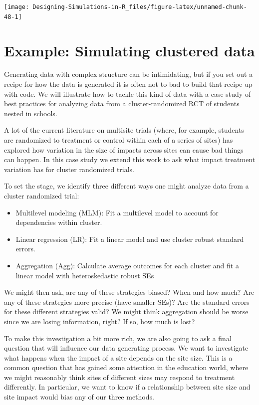\documentclass[
]{book}
\providecommand{\tightlist}{%
  \setlength{\itemsep}{0pt}\setlength{\parskip}{0pt}}
\begin{document}
\begin{center}\texttt{[image: Designing-Simulations-in-R\_files/figure-latex/unnamed-chunk-48-1]} \end{center}

\hypertarget{case_cluster}{%
\section{Example: Simulating clustered data}\label{case_cluster}}

Generating data with complex structure can be intimidating, but if you set out a recipe for how the data is generated it is often not to bad to build that recipe up with code.
We will illustrate how to tackle this kind of data with a case study of best practices for analyzing data from a cluster-randomized RCT of students nested in schools.

A lot of the current literature on multisite trials (where, for example, students are randomized to treatment or control within each of a series of sites) has explored how variation in the size of impacts across sites can cause bad things can happen.
In this case study we extend this work to ask what impact treatment variation has for cluster randomized trials.

To set the stage, we identify three different ways one might analyze data from a cluster randomized trial:

\begin{itemize}
\tightlist
\item
  Multilevel modeling (MLM): Fit a multilevel model to account for dependencies within cluster.
\item
  Linear regression (LR): Fit a linear model and use cluster robust standard errors.
\item
  Aggregation (Agg): Calculate average outcomes for each cluster and fit a linear model with heteroskedastic robust SEs
\end{itemize}

We might then ask, are any of these strategies biased? When and how much?
Are any of these strategies more precise (have smaller SEs)?
Are the standard errors for these different strategies valid?
We might think aggregation should be worse since we are losing information, right?
If so, how much is lost?

To make this investigation a bit more rich, we are also going to ask a final question that will influence our data generating process.
We want to investigate what happens when the impact of a site depends on the site size.
This is a common question that has gained some attention in the education world, where we might reasonably think sites of different sizes may respond to treatment differently.
In particular, we want to know if a relationship between site size and site impact would bias any of our three methods.
\end{document}
